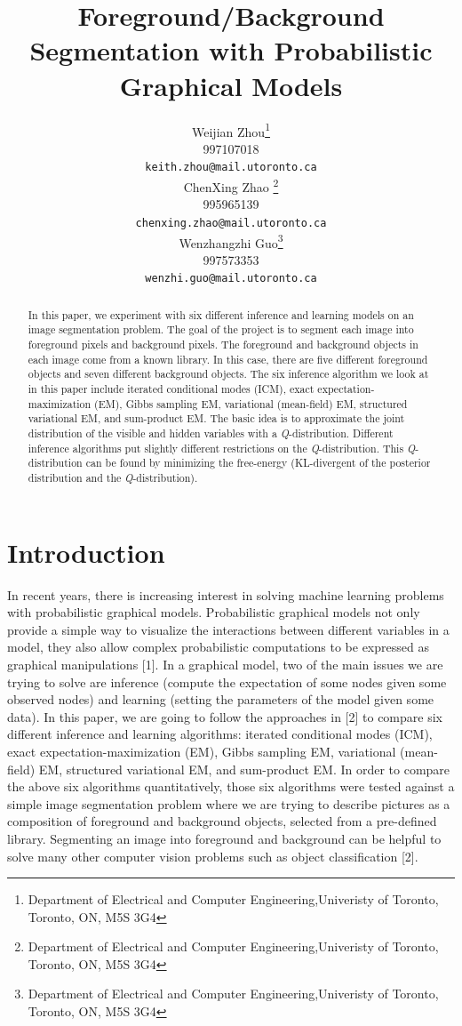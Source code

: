\documentclass{article} %
\title{Foreground/Background Segmentation with Probabilistic Graphical Models}
\author{
Weijian Zhou\thanks{Department of Electrical and Computer Engineering,Univeristy of Toronto, Toronto, ON, M5S 3G4} \\
997107018 \\
\texttt{keith.zhou@mail.utoronto.ca} \\
\And
ChenXing Zhao \thanks{Department of Electrical and Computer Engineering,Univeristy of Toronto, Toronto, ON, M5S 3G4} \\
995965139\\
\texttt{chenxing.zhao@mail.utoronto.ca} \\
\AND
Wenzhangzhi Guo\thanks{Department of Electrical and Computer Engineering,Univeristy of Toronto, Toronto, ON, M5S 3G4}  \\
997573353 \\
\texttt{wenzhi.guo@mail.utoronto.ca} \\
}
\begin{document}
\maketitle

\begin{abstract}
In this paper, we experiment with six different inference and learning models on an image segmentation problem. The goal of the project is to segment each image into foreground pixels and background pixels. The foreground and background objects in each image come from a known library. In this case, there are five different foreground objects and seven different background objects. The six inference algorithm we look at in this paper include iterated conditional modes (ICM), exact expectation-maximization (EM), Gibbs sampling EM, variational (mean-field) EM, structured variational EM, and sum-product EM. The basic idea is to approximate the joint distribution of the visible and hidden variables with a \textit{Q}-distribution. Different inference algorithms put slightly different restrictions on the \textit{Q}-distribution. This \textit{Q}-distribution can be found by minimizing the free-energy (KL-divergent of the posterior distribution and the \textit{Q}-distribution).
\end{abstract}

\section{Introduction}
\label{intro}
In recent years, there is increasing interest in solving machine learning problems with probabilistic graphical models. Probabilistic graphical models not only provide a simple way to visualize the interactions between different variables in a model, they also allow complex probabilistic computations to be expressed as graphical manipulations [1]. In a graphical model, two of the main issues we are trying to solve are inference (compute the expectation of some nodes given some observed nodes) and learning (setting the parameters of the model given some data). In this paper, we are going to follow the approaches in [2] to compare six different inference and learning algorithms: iterated conditional modes (ICM), exact expectation-maximization (EM), Gibbs sampling EM, variational (mean-field) EM, structured variational EM, and sum-product EM. In order to compare the above six algorithms quantitatively, those six algorithms were tested against a simple image segmentation problem where we are trying to describe pictures as a composition of foreground and background objects, selected from a pre-defined library. Segmenting an image into foreground and background can be helpful to solve many other computer vision problems such as object classification [2].
\end{document}
